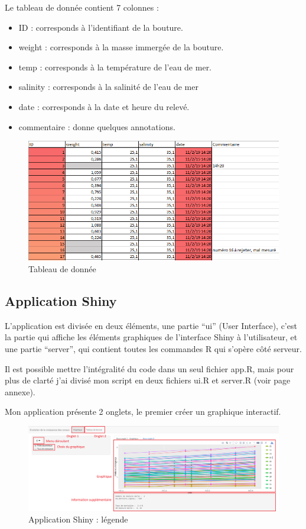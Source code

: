 \documentclass[]{report}
\begin{document}
Le tableau de donnée contient 7 colonnes :

\begin{itemize}
\item
  ID : corresponds à l'identifiant de la bouture.
\item
  weight : corresponds à la masse immergée de la bouture.
\item
  temp : corresponds à la température de l'eau de mer.
\item
  salinity : corresponds à la salinité de l'eau de mer
\item
  date : corresponds à la date et heure du relevé.
\item
  commentaire : donne quelques annotations.
\end{itemize}

\begin{figure}[h!]
\includegraphics[]{../image/excel1.PNG}
\caption{Tableau de donnée}
\end{figure}

\subsection{Application Shiny}\label{application-shiny}

L'application est divisée en deux éléments, une partie ``ui'' (User
Interface), c'est la partie qui affiche les éléments graphiques de
l'interface Shiny à l'utilisateur, et une partie ``server'', qui
contient toutes les commandes R qui s'opère côté serveur.

Il est possible mettre l'intégralité du code dans un seul fichier app.R,
mais pour plus de clarté j'ai divisé mon script en deux fichiers ui.R et
server.R (voir page annexe).

Mon application présente 2 onglets, le premier créer un graphique
interactif.

\begin{figure}[h!]
\includegraphics[]{../image/shiny1.PNG}
\caption{Application Shiny : légende}
\end{figure}
\end{document}

